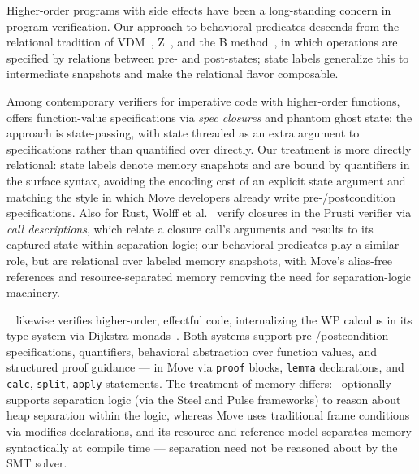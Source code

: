 \label{sec:conclusion}

\label{sec:related}

Higher-order programs with side effects have been a long-standing concern in program verification.
Our approach to behavioral predicates descends from the relational tradition of VDM~\cite{jones1990vdm}, Z~\cite{spivey1992z, grieskamp2000executablez}, and the B method~\cite{abrial1996bbook}, in which operations are specified by relations between pre- and post-states; state labels generalize this to intermediate snapshots and make the relational flavor composable.

Among contemporary verifiers for imperative code with higher-order functions, \verus~\cite{verus} offers function-value specifications via \emph{spec closures} and phantom ghost state; the approach is state-passing, with state threaded as an extra argument to specifications rather than quantified over directly.
Our treatment is more directly relational: state labels denote memory snapshots and are bound by quantifiers in the surface syntax, avoiding the encoding cost of an explicit state argument and matching the style in which Move developers already write pre-/postcondition specifications.
Also for Rust, Wolff et al.~\cite{RustClosures21} verify closures in the Prusti verifier via \emph{call descriptions}, which relate a closure call's arguments and results to its captured state within separation logic; our behavioral predicates play a similar role, but are relational over labeled memory snapshots, with Move's alias-free references and resource-separated memory removing the need for separation-logic machinery.

\fstar~\cite{fstar2016} likewise verifies higher-order, effectful code, internalizing the WP calculus in its type system via Dijkstra monads~\cite{dm4all}.
Both systems support pre-/postcondition specifications, quantifiers, behavioral abstraction over function values, and structured proof guidance --- in Move via \texttt{proof} blocks, \texttt{lemma} declarations, and \texttt{calc}, \texttt{split}, \texttt{apply} statements.
The treatment of memory differs: \fstar~optionally supports separation logic (via the Steel and Pulse frameworks) to reason about heap separation within the logic, whereas Move uses traditional frame conditions via modifies declarations, and its resource and reference model separates memory syntactically at compile time --- separation need not be reasoned about by the SMT solver.

